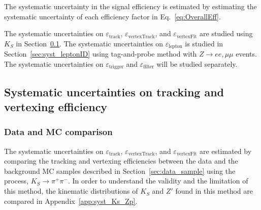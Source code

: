 The systematic uncertainty in the signal efficiency is estimated by estimating the systematic uncertainty of each efficiency factor in Eq.~\ref{eq:OverallEff}.

The systematic uncertainties on $\varepsilon_{\mathrm{track}}$, $\varepsilon_{\mathrm{vertexTrack}}$, and $\varepsilon_{\mathrm{vertexFit}}$ are studied using $K_{S}$ in Section~\ref{sec:syst_vertexing}. The systematic uncertainties on $\varepsilon_{\mathrm{lepton}}$ is studied in Section~\ref{sec:syst_leptonID} using tag-and-probe method with $Z\rightarrow ee,\mu\mu$ events. The systematic uncertainties on $\varepsilon_{\mathrm{trigger}}$ and $\varepsilon_{\mathrm{filter}}$ will be studied separately.

\subsection{Systematic uncertainties on tracking and vertexing efficiency}
\label{sec:syst_vertexing}
\subsubsection{Data and MC comparison}
\label{sec:vertexing_systematics_data_MC}
The systematic uncertainties on $\varepsilon_{\mathrm{track}}$, $\varepsilon_{\mathrm{vertexTrack}}$, and $\varepsilon_{\mathrm{vertexFit}}$ are estimated by comparing the tracking and vertexing efficiencies between the data and the background MC samples described in Section~\ref{sec:data_sample} using the process, $K_{S}\rightarrow\pi^{+}\pi^{-}$. In order to understand the validity and the limitation of this method, the kinematic distributions of $K_{S}$ and $Z'$ found in this method are compared in Appendix~\ref{app:syst_Ks_Zp}.



